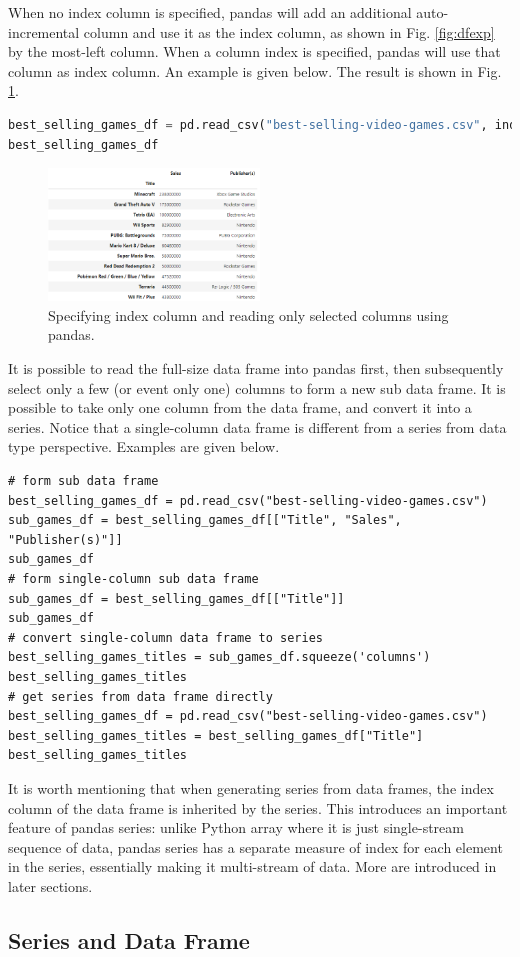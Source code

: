 When no index column is specified, pandas will add an additional auto-incremental column and use it as the index column, as shown in Fig. \ref{fig:dfexp} by the most-left column. When a column index is specified, pandas will use that column as index column. An example is given below. The result is shown in Fig. \ref{fig:dfex2}.
\begin{lstlisting}[language=python]
best_selling_games_df = pd.read_csv("best-selling-video-games.csv", index_col = "Title", usecols = ["Title", "Sales", "Publisher(s)"])
best_selling_games_df
\end{lstlisting}
\begin{figure}[htbp]
	\centering
	\includegraphics[width=0.5\textwidth]{chapters/part-3/figures/df_example2.png}
	\caption{Specifying index column and reading only selected columns using pandas.}
	\label{fig:dfex2}
\end{figure}

It is possible to read the full-size data frame into pandas first, then subsequently select only a few (or event only one) columns to form a new sub data frame. It is possible to take only one column from the data frame, and convert it into a series. Notice that a single-column data frame is different from a series from data type perspective. Examples are given below.
\begin{lstlisting}
# form sub data frame
best_selling_games_df = pd.read_csv("best-selling-video-games.csv")
sub_games_df = best_selling_games_df[["Title", "Sales", "Publisher(s)"]]
sub_games_df
# form single-column sub data frame
sub_games_df = best_selling_games_df[["Title"]]
sub_games_df
# convert single-column data frame to series
best_selling_games_titles = sub_games_df.squeeze('columns')
best_selling_games_titles
# get series from data frame directly
best_selling_games_df = pd.read_csv("best-selling-video-games.csv")
best_selling_games_titles = best_selling_games_df["Title"]
best_selling_games_titles
\end{lstlisting}

It is worth mentioning that when generating series from data frames, the index column of the data frame is inherited by the series. This introduces an important feature of pandas series: unlike Python array where it is just single-stream sequence of data, pandas series has a separate measure of index for each element in the series, essentially making it multi-stream of data. More are introduced in later sections.

\subsection{Series and Data Frame}
